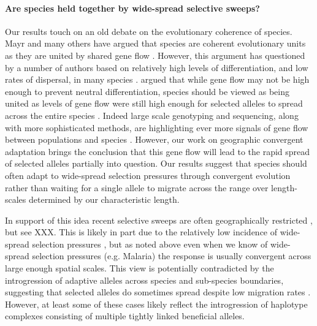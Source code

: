\documentclass{article}
\newcommand{\gc}[1]{{\it\color{green}(#1)} }
\begin{document}
\paragraph{Are species held together by wide-spread selective sweeps?}
Our results touch on an old debate on the evolutionary coherence of
species. Mayr and many others have argued that species are coherent
evolutionary units as they are united by shared gene flow \citep[pages
521–522 ][]{Mayr:SpeciesEvol}. However, this argument has
questioned by a number of authors based on relatively high levels of 
differentiation, and low rates of dispersal, in many species \citep{EhrlichRaven:69,Levin:79}.
\citet{Rieseberg2001,MorjanRieseberg:04} argued that while gene flow
may not be high enough to prevent neutral differentiation, species
should be viewed as being united as levels of gene flow were still
high enough for selected alleles to spread across the entire species \citep{Ellstrand2014s}.
Indeed large scale genotyping and sequencing, along with more
sophisticated methods, are highlighting ever more signals of gene flow
between populations and species \citep{}.
However, our work on geographic convergent adaptation
\citep[see also][]{ralph2010parallel,RalphCoop:14} brings the
conclusion that this gene flow will lead to the rapid spread of
selected alleles partially into
question. Our results suggest that species should often adapt to
wide-spread selection pressures through convergent evolution rather
than waiting for a single allele to migrate across the range over
length-scales determined by our characteristic length.
 
In support of this idea recent selective sweeps are often
geographically restricted \citep{}, but see XXX. This is likely in part due to the
relatively low incidence of wide-spread selection pressures \citep{},
but as noted above even when we know of wide-spread selection
pressures (e.g. Malaria) the response is usually convergent across large enough
spatial scales. This view is potentially contradicted by the
introgression of adaptive alleles across species and sub-species
boundaries, suggesting that selected alleles do sometimes spread
despite low migration rates \citep{hedrick2013adaptive}. However, at least some of
these cases likely reflect the introgression of haplotype complexes
consisting of multiple tightly linked beneficial
alleles.  

\end{document}
